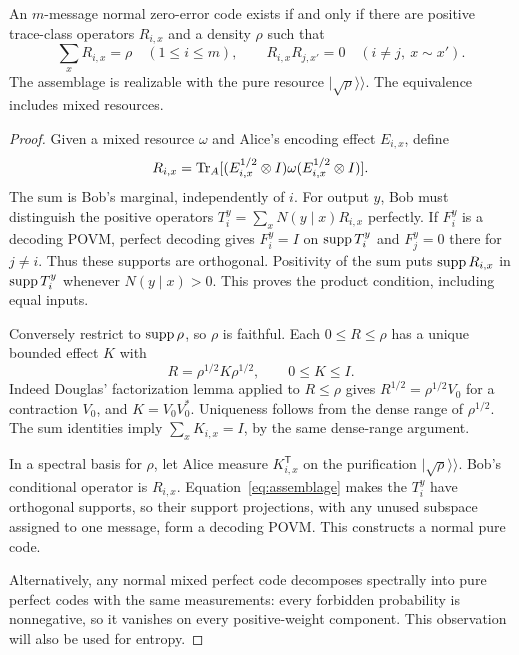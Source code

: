 \begin{lemma}\label{lem:assemblage}
An $m$-message normal zero-error code exists if and only if there are positive trace-class operators $R_{i,x}$ and a density $\rho$ such that
\begin{equation}\label{eq:assemblage}
 \sum_xR_{i,x}=\rho\quad(1\leq i\leq m),\qquad
 R_{i,x}R_{j,x'}=0\quad(i\ne j,\ x\sim x').
\end{equation}
The assemblage is realizable with the pure resource $|\sqrt\rho\rangle\!\rangle$. The equivalence includes mixed resources.
\end{lemma}
\begin{proof}
Given a mixed resource $\omega$ and Alice's encoding effect $E_{i,x}$, define
\[
 R_{i,x}=\operatorname{Tr}_A[(E_{i,x}^{1/2}\otimes I)\omega(E_{i,x}^{1/2}\otimes I)].
\]
The sum is Bob's marginal, independently of $i$. For output $y$, Bob must distinguish the positive operators $T_i^y=\sum_xN(y\mid x)R_{i,x}$ perfectly. If $F_i^y$ is a decoding POVM, perfect decoding gives $F_i^y=I$ on $\operatorname{supp} T_i^y$ and $F_j^y=0$ there for $j\ne i$. Thus these supports are orthogonal. Positivity of the sum puts $\operatorname{supp} R_{i,x}$ in $\operatorname{supp} T_i^y$ whenever $N(y\mid x)>0$. This proves the product condition, including equal inputs.

Conversely restrict to $\operatorname{supp}\rho$, so $\rho$ is faithful. Each $0\leq R\leq\rho$ has a unique bounded effect $K$ with
\begin{equation}\label{eq:douglas}
 R=\rho^{1/2}K\rho^{1/2},\qquad 0\leq K\leq I.
\end{equation}
Indeed Douglas' factorization lemma \cite{Douglas} applied to $R\leq\rho$ gives $R^{1/2}=\rho^{1/2}V_0$ for a contraction $V_0$, and $K=V_0V_0^*$. Uniqueness follows from the dense range of $\rho^{1/2}$. The sum identities imply $\sum_xK_{i,x}=I$, by the same dense-range argument.

In a spectral basis for $\rho$, let Alice measure $K_{i,x}^{\mathsf T}$ on the purification $|\sqrt\rho\rangle\!\rangle$. Bob's conditional operator is $R_{i,x}$. Equation~\eqref{eq:assemblage} makes the $T_i^y$ have orthogonal supports, so their support projections, with any unused subspace assigned to one message, form a decoding POVM. This constructs a normal pure code.

Alternatively, any normal mixed perfect code decomposes spectrally into pure perfect codes with the same measurements: every forbidden probability is nonnegative, so it vanishes on every positive-weight component. This observation will also be used for entropy.
\end{proof}

